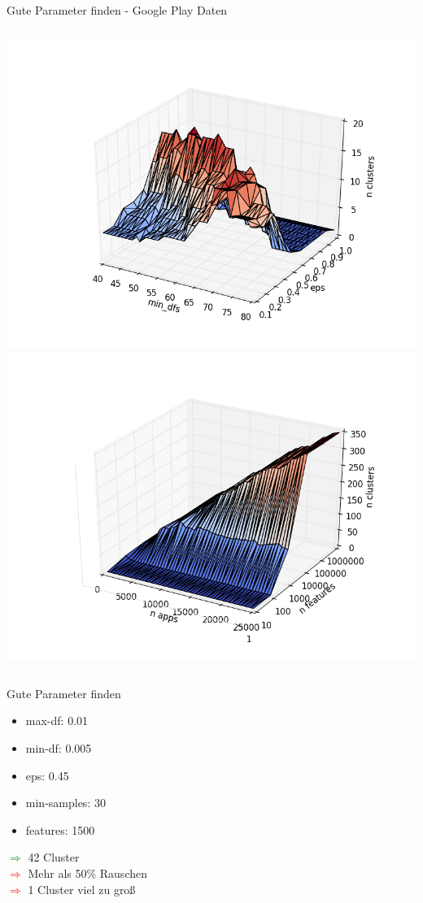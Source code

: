 \documentclass[compress,t]{beamer}
\begin{document}
\begin{frame}{Gute Parameter finden - Google Play Daten}
\begin{columns}[t]
        \includegraphics[width=1.0\textwidth]{img/gp_2_cosin_nofc.png}\\
        \includegraphics[width=1.0\textwidth]{img/features_3_nofc.png}
    \end{columns}

\end{frame}

\begin{frame}{Gute Parameter finden}

    \begin{itemize}
        \item max-df: 0.01
        \item min-df: 0.005
        \item eps: 0.45
        \item min-samples: 30
        \item features: 1500
    \end{itemize}

    \textcolor{green}{\(\Rightarrow\)} 42 Cluster\\
    \textcolor{red}{\(\Rightarrow\)} Mehr als 50\% Rauschen\\
    \textcolor{red}{\(\Rightarrow\)} 1 Cluster viel zu groß

\end{frame}
\end{document}
